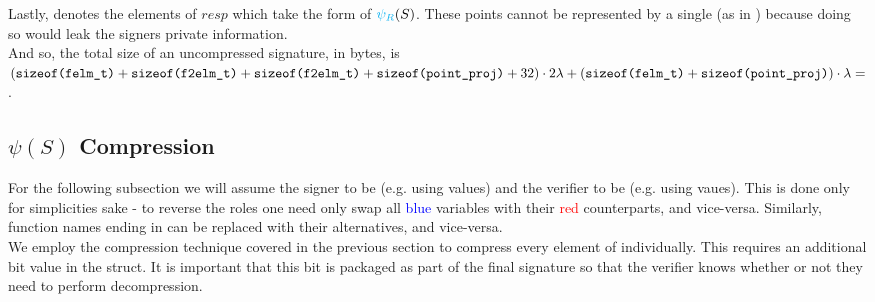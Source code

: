 Lastly,  denotes the elements of $resp$ which take the form of $\textcolor{cyan}{\psi_R}(S)$. These points cannot be represented by a single  (as in ) because doing so would leak the signers private information.\\

\noindent
And so, the total size of an uncompressed \sidh signature, in bytes, is $
(\texttt{sizeof(felm\_t)} + \texttt{sizeof(f2elm\_t)} + \texttt{sizeof(f2elm\_t)} + \texttt{sizeof(point\_proj)} + 32) \cdot 2\lambda + (\texttt{sizeof(felm\_t)} + \texttt{sizeof(point\_proj)}) \cdot \lambda  = $.

\subsection{$\psi(S)$ Compression}

For the following subsection we will assume the signer to be \bob (e.g. using \rb values) and the verifier to be \alice (e.g. using \ba vaues). This is done only for simplicities sake - to reverse the roles one need only swap all \textcolor{blue}{blue} variables with their \textcolor{red}{red} counterparts, and vice-versa. Similarly, function names ending in  can be replaced with their  alternatives, and vice-versa.\\

\noindent
We employ the compression technique covered in the previous section to compress every element of  individually. This requires an additional bit value  in the  struct. It is important that this bit is packaged as part of the final signature so that the verifier knows whether or not they need to perform decompression. 

